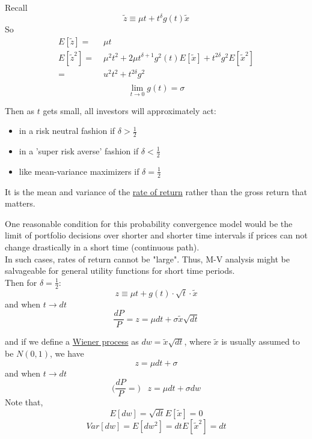 \documentclass[
14pt,notheorems,hyperref={pdfauthor=whatever}
]{beamer}
\begin{document}
\begin{frame}
Recall\\
\[\tilde z \equiv \mu t + t^\delta g(t) \tilde x\]
So\\
\begin{align*}
    E[\tilde z] =&\; \mu t\\
    E[\tilde z^2] =&\; \mu^2 t^2 + 2\mu t^{\delta+1} g^2(t) E[\tilde x] + t^{2\delta}g^2 E[\tilde x^2]\\
    =&\; u^2t^2+t^{2\delta}g^2\\
\end{align*}
\[\lim_{t\to0} g(t) = \sigma\]
\end{frame}

\begin{frame}
Then as $t$ gets small, all investors will approximately act:\\
\begin{itemize}
    \item in a risk neutral fashion if $\delta>\frac{1}{2}$
    \item in a 'super risk averse' fashion if $\delta<\frac{1}{2}$
    \item like mean-variance maximizers if $\delta=\frac{1}{2}$
\end{itemize}
\hfill\break
It is the mean and variance of the \underline{rate of return} rather than the gross return that matters.\\
\end{frame}

\begin{frame}
One reasonable condition for this probability convergence model would be the limit of portfolio decisions over shorter and shorter time intervals if prices can not change drastically in a short time (continuous path).\\
\hfill\break
In such cases, rates of return cannot be "large". Thus, M-V analysis might be salvageable for general utility functions for short time periods.\\
\hfill\break
Then for $\delta=\frac{1}{2}$:\\
\[z \equiv \mu t + g(t)\cdot \sqrt{t} \cdot \tilde x\]
and when $t \to dt$\\
\[\frac{dP}{P} = z = \mu dt + \sigma \tilde x \sqrt{dt} \]
\end{frame}

\begin{frame}
and if we define a \underline{Wiener process} as $dw = \tilde x \sqrt{dt}$, where $\tilde x$ is usually assumed to be $N(0,1)$, we have
\[z = \mu dt + \sigma \]
and when $t \to dt$\\
\[\bigg(\frac{dP}{P} =\bigg)\;\;\; z = \mu dt + \sigma dw \]
Note that,
\[ E[dw] = \sqrt{dt}E[\tilde x] = 0 \]
\[ Var[dw] = E[dw^2] = dt E[\tilde x^2] = dt \]
\end{frame}
\end{document}
